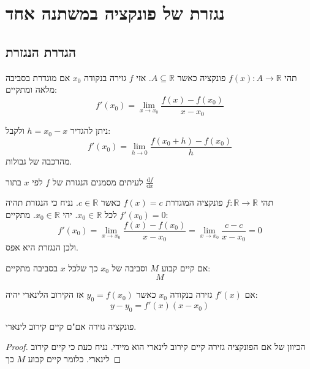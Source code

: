 \documentclass{tstextbook}
\begin{document}
\section{נגזרת של פונקציה במשתנה אחד}

\subsection{הגדרת הנגזרת}

\begin{definition}
תהי \(f(x):A\to \mathbb{R}\) פונקציה כאשר \(A\subseteq \mathbb{R}\). אזי \(f\) גזירה בנקודה \(x_{0}\) אם מוגדרת בסביבה מלאה ומתקיים:
$$f'(x_{0})= \lim_{ x \to x_{0} } \frac{f(x)-f(x_{0})}{x-x_{0}}$$

\end{definition}
\begin{corollary}
ניתן להגדיר \(h=x_{0}-x\) ולקבל:
$$f'(x_{0})=\lim_{ h \to 0 } \frac{f(x_{0}+h)-f(x_{0})}{h}$$
מהרכבה של גבולות.

\end{corollary}
\begin{symbolize}
לעיתים מסמנים הנגזרת של \(f\) לפי \(x\) בתור \(\frac{\mathrm{d} f}{\mathrm{d} x}\)

\end{symbolize}
\begin{example}
תהי \(f:\mathbb{R}\to \mathbb{R}\) פונקציה המוגדרת \(f(x)=c\) כאשר \(c \in \mathbb{R}\). נניח כי הנגזרת תהיה \(f'(x_{0})=0\) לכל \(x_{0} \in \mathbb{R}\). יהי \(x_{0} \in \mathbb{R}\). מתקיים:
$$f'(x_{0})= \lim_{ x \to x_{0} } \frac{f(x)-f(x_{0})}{x-x_{0}} = \lim_{ x \to x_{0} } \frac{c-c}{x-x_{0}}=0$$
ולכן הנגזרת היא אפס.

\end{example}
\begin{definition}
אם קיים קבוע \(M\) וסביבה של \(x_{0}\) כך שלכל \(x\) בסביבה מתקיים:
$$M$$

\end{definition}
\begin{proposition}
אם \(f'(x)\) גזירה בנקודה \(x_{0}\) כאשר \(y_{0}=f(x_{0})\) אז הקירוב הלינארי יהיה:
$$y-y_{0}=f'(x)(x-x_{0})$$

\end{proposition}
\begin{proposition}
פונקציה גזירה אם"ם קיים קירוב לינארי.

\end{proposition}
\begin{proof}
הכיוון של אם הפונקציה גזירה קיים קירוב לינארי הוא מיידי. נניח כעת כי קיים קירוב לינארי. כלומר קיים קבוע \(M\) כך

\end{proof}
\end{document}
